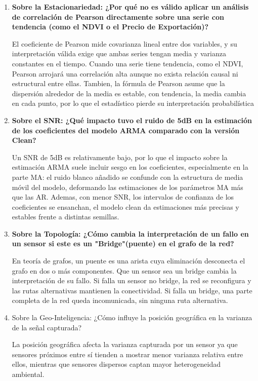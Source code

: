 \documentclass[11pt,a4paper]{article}
\begin{document}
\begin{enumerate}
    \item \textbf{Sobre la Estacionariedad: ¿Por qué no es válido aplicar un análisis de correlación de Pearson directamente sobre una serie con tendencia (como el NDVI o el Precio de Exportación)?}


    El coeficiente de Pearson mide covarianza lineal entre dos variables, y su interpretación válida exige que ambas series tengan media y varianza constantes en el tiempo. Cuando una serie tiene tendencia, como el NDVI, Pearson arrojará una correlación alta aunque no exista relación causal ni estructural entre ellas. Tambien, la fórmula de Pearson asume que la dispersión alrededor de la media es estable, con tendencia, la media cambia en cada punto, por lo que el estadístico pierde su interpretación probabilística
    

    \item \textbf{Sobre el SNR: ¿Qué impacto tuvo el ruido de 5dB en la estimación de los coeficientes del modelo ARMA comparado con la versión Clean?}


    Un SNR de 5dB es relativamente bajo, por lo que el impacto sobre la estimación ARMA suele incluir sesgo en los coeficientes, especialmente en la parte MA: el ruido blanco añadido se confunde con la estructura de media móvil del modelo, deformando las estimaciones de los parámetros MA más que las AR. Ademas, con menor SNR, los intervalos de confianza de los coeficientes se ensanchan, el modelo clean da estimaciones más precisas y estables frente a distintas semillas.


    \item \textbf{Sobre la Topología: ¿Cómo cambia la interpretación de un fallo en un sensor si este es un "Bridge"(puente) en el grafo de la red?}


    En teoría de grafos, un puente es una arista cuya eliminación desconecta el grafo en dos o más componentes. Que un sensor sea un bridge cambia la interpretación de su fallo. Si falla un sensor no bridge, la red se reconfigura y las rutas alternativas mantienen la conectividad. Si falla un bridge, una parte completa de la red queda incomunicada, sin ninguna ruta alternativa.
    

    \item  Sobre la Geo-Inteligencia: ¿Cómo influye la posición geográfica en la varianza de la señal capturada?

    La posición geográfica afecta la varianza capturada por un sensor ya que sensores próximos entre sí tienden a mostrar menor varianza relativa entre ellos, mientras que sensores dispersos captan mayor heterogeneidad ambiental.


\end{enumerate}
\end{document}
